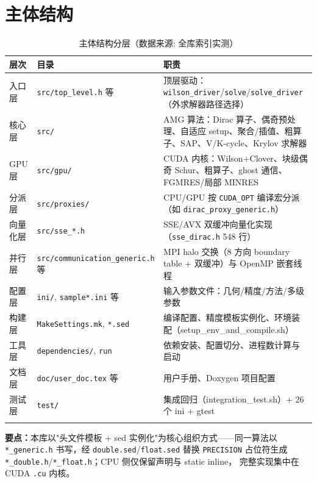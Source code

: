 \documentclass[UTF8]{ctexart}
\begin{document}
\section{主体结构}
\begin{xltabular}{\textwidth}{lXX}
\toprule
\textcolor{struct}{层次} & 目录 & \textcolor{struct}{职责} \\
\midrule
\endhead
入口层 & \texttt{\nolinkurl{src/top_level.h}} 等 & 顶层驱动：\texttt{\nolinkurl{wilson_driver}}/\texttt{solve}/\texttt{\nolinkurl{solve_driver}}（外求解器路径选择）\\
核心层 & \texttt{src/} & AMG 算法：Dirac 算子、偶奇预处理、自适应 setup、聚合/插值、粗算子、SAP、V/K-cycle、Krylov 求解器 \\
GPU 层 & \texttt{src/gpu/} & CUDA 内核：Wilson+Clover、块级偶奇 Schur、粗算子、ghost 通信、FGMRES/局部 MINRES \\
分派层 & \texttt{src/proxies/} & CPU/GPU 按 \texttt{CUDA\_OPT} 编译宏分派（如 \texttt{\nolinkurl{dirac_proxy_generic.h}}） \\
向量化层 & \texttt{src/sse\_*.h} & SSE/AVX 双缓冲向量化实现（\texttt{\nolinkurl{sse_dirac.h}} 548 行） \\
并行层 & \texttt{\nolinkurl{src/communication_generic.h}} 等 & MPI halo 交换（8 方向 boundary table + 双缓冲）与 OpenMP 嵌套线程 \\
配置层 & \texttt{ini/}, \texttt{sample*.ini} 等 & 输入参数文件：几何/精度/方法/多级参数 \\
构建层 & \texttt{MakeSettings.mk}, \texttt{*.sed} & 编译配置、精度模板实例化、环境装配（setup\_env\_and\_compile.sh） \\
工具层 & \texttt{dependencies/}, \texttt{run} & 依赖安装、配置切分、进程数计算与启动 \\
文档层 & \texttt{doc/user\_doc.tex} 等 & 用户手册、Doxygen 项目配置 \\
测试层 & \texttt{test/} & 集成回归（integration\_test.sh）+ 26 个 ini + gtest \\
\bottomrule
\caption{主体结构分层（数据来源: 全库索引实测）}
\end{xltabular}

\begin{keybox}
\textbf{要点：}本库以"头文件模板 + sed 实例化"为核心组织方式——同一算法以
\texttt{*\_generic.h} 书写，经 \texttt{double.sed}/\texttt{float.sed} 替换 \texttt{PRECISION}
占位符生成 \texttt{*\_double.h}/\texttt{*\_float.h}；CPU 侧仅保留声明与 static inline，
完整实现集中在 CUDA \texttt{.cu} 内核。
\end{keybox}
\end{document}
